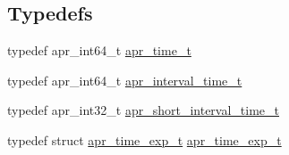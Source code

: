 \subsection*{Typedefs}
\begin{DoxyCompactItemize}
\item 
typedef apr\-\_\-int64\-\_\-t \hyperlink{group__apr__time_gadb4bde16055748190eae190c55aa02bb}{apr\-\_\-time\-\_\-t}
\item 
typedef apr\-\_\-int64\-\_\-t \hyperlink{group__apr__time_gaae2129185a395cc393f76fabf4f43e47}{apr\-\_\-interval\-\_\-time\-\_\-t}
\item 
typedef apr\-\_\-int32\-\_\-t \hyperlink{group__apr__time_ga3e4663cc0d8b730902ff697c8d3f64be}{apr\-\_\-short\-\_\-interval\-\_\-time\-\_\-t}
\item 
typedef struct \hyperlink{structapr__time__exp__t}{apr\-\_\-time\-\_\-exp\-\_\-t} \hyperlink{group__apr__time_gae28f2767111a534f263ced95a28489b1}{apr\-\_\-time\-\_\-exp\-\_\-t}
\end{DoxyCompactItemize}
